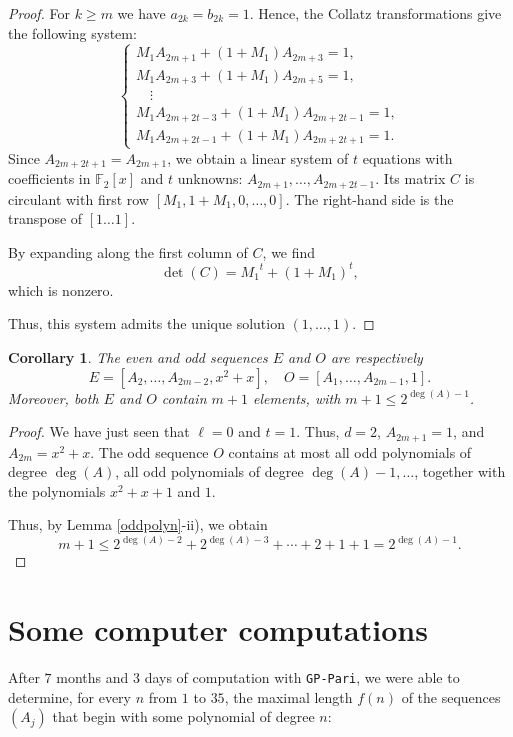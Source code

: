 \documentclass [12pt]{article}
\newtheorem{corollary}[theorem]{Corollary}
\begin{document}
\begin{proof}
For $k \geq m$ we have $a_{2k} = b_{2k} = 1$. Hence, the Collatz transformations give the following system:
\[
\left\{\begin{array}{l}
M_1 A_{2m+1} + (1+M_1) A_{2m+3} = 1,\\
M_1 A_{2m+3} + (1+M_1) A_{2m+5} = 1,\\
\quad \vdots \\
M_1 A_{2m+2t-3} + (1+M_1) A_{2m+2t-1} = 1,\\
M_1 A_{2m+2t-1} + (1+M_1) A_{2m+2t+1} = 1.
\end{array}\right.
\]
Since $A_{2m+2t+1} = A_{2m+1}$, we obtain a linear system of $t$ equations with coefficients in $\mathbb{F}_2[x]$ and
$t$ unknowns: $A_{2m+1}, \ldots, A_{2m+2t-1}$. Its matrix $C$ is circulant with first row $[M_1, 1+M_1, 0, \ldots, 0]$. The right-hand side is the transpose of $[1 \ldots 1]$.

By expanding along the first column of $C$, we find
\[
\det(C) = {M_1}^t + (1+M_1)^t,
\]
which is nonzero.

Thus, this system admits the unique solution $(1, \ldots, 1)$.
\end{proof}

\begin{corollary} \label{casell=0}
The even and odd sequences $E$ and $O$ are respectively
\[
E = [A_2, \ldots, A_{2m-2}, x^2+x], \quad O = [A_1, \ldots, A_{2m-1}, 1].
\]
Moreover, both $E$ and $O$ contain $m+1$ elements, with $m+1 \leq 2^{\deg(A)-1}$.
\end{corollary}

\begin{proof}
We have just seen that $\ell = 0$ and $t=1$. Thus, $d = 2$, $A_{2m+1} = 1$, and $A_{2m} = x^2+x$.  
The odd sequence $O$ contains at most all odd polynomials of degree $\deg(A)$, all odd polynomials of degree $\deg(A)-1, \ldots$, together with the polynomials $x^2+x+1$ and $1$.  

Thus, by Lemma \ref{oddpolyn}-ii), we obtain
\[
m+1 \leq 2^{\deg(A)-2} + 2^{\deg(A)-3} + \cdots + 2 + 1 + 1 = 2^{\deg(A)-1}.
\]
\end{proof}

\section{Some computer computations} \label{exemples}

After $7$ months and $3$ days of computation with {\tt GP-Pari}, we were able to determine, for every $n$ from $1$ to $35$, the maximal length $f(n)$ of the sequences $(A_j)$ that begin with some polynomial of degree $n$:
\end{document}
